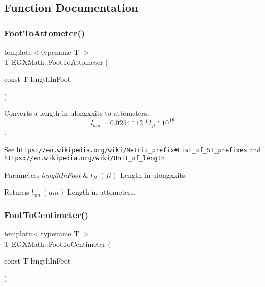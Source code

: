\subsection{Function Documentation}
\mbox{\label{group___e_g_x_math-_conversions-_length_conversions-_imperial-_foot-_s_i_ga3831d7a5d7bced625576f0d07644cf24}} 
\subsubsection{\texorpdfstring{Foot\+To\+Attometer()}{FootToAttometer()}}
{\footnotesize\ttfamily template$<$typename T $>$ \\
T E\+G\+X\+Math\+::\+Foot\+To\+Attometer (\begin{DoxyParamCaption}\item[{const T}]{length\+In\+Foot }\end{DoxyParamCaption})}



Converts a length in ulongxxits to attometers. \[ l_{am}=0.0254 * 12 * l_{ft} * 10^{18} \]. 

See \href{https://en.wikipedia.org/wiki/Metric_prefix#List_of_SI_prefixes}{\tt https\+://en.\+wikipedia.\+org/wiki/\+Metric\+\_\+prefix\#\+List\+\_\+of\+\_\+\+S\+I\+\_\+prefixes} and \href{https://en.wikipedia.org/wiki/Unit_of_length}{\tt https\+://en.\+wikipedia.\+org/wiki/\+Unit\+\_\+of\+\_\+length} 
\begin{DoxyParams}{Parameters}
{\em length\+In\+Foot} & $ l_{ft}\ (ft)$ Length in ulongxxits. \\
\hline
\end{DoxyParams}
\begin{DoxyReturn}{Returns}
$ l_{am}\ (am)$ Length in attometers. 
\end{DoxyReturn}
\mbox{\label{group___e_g_x_math-_conversions-_length_conversions-_imperial-_foot-_s_i_ga43e05fc21b1282adc195fe7178b2a1fc}} 
\subsubsection{\texorpdfstring{Foot\+To\+Centimeter()}{FootToCentimeter()}}
{\footnotesize\ttfamily template$<$typename T $>$ \\
T E\+G\+X\+Math\+::\+Foot\+To\+Centimeter (\begin{DoxyParamCaption}\item[{const T}]{length\+In\+Foot }\end{DoxyParamCaption})}



